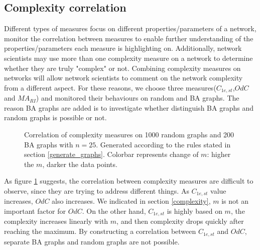 \documentclass[12pt]{article}
\begin{document}
\subsection{Complexity correlation}
Different types of measures focus on different properties/parameters of a network, monitor the correlation between measures to enable further understanding of the properties/parameters each measure is highlighting on. Additionally, network scientists may use more than one complexity measure on a network to determine whether they are truly "complex" or not. Combining complexity measures on networks will allow network scientists to comment on the network complexity from a different aspect. For these reasons, we choose three measures($C_{1e,st}$,$OdC$ and $MA_{RI}$) and monitored their behaviours on random and BA graphs. The reason BA graphs are added is to investigate whether distinguish BA graphs and random graphs is possible or not.\\
\begin{figure}[h!]
    \caption{Correlation of complexity measures on 1000 random graphs and 200 BA graphs with $n=25$. Generated according to the rules stated in section \ref{generate_graphs}. Colorbar represents change of $m$: higher the $m$, darker the data points.}
    \label{fig:correlation}
\end{figure}
\par
As figure \ref{fig:correlation} suggests, the correlation between complexity measures are difficult to observe, since they are trying to address different things. As $C_{1e,st}$ value increases, $OdC$ also increases. We indicated in section \ref{complexity}, $m$ is not an important factor for $OdC$. On the other hand, $C_{1e,st}$ is highly based on $m$, the complexity increases linearly with $m$, and then complexity drops quickly after reaching the maximum. By constructing a correlation between $C_{1e,st}$ and $OdC$, separate BA graphs and random graphs are not possible.\par
\end{document}
